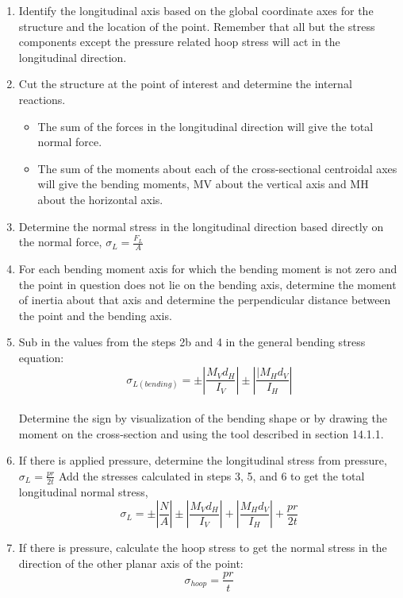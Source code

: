 \documentclass[
  letterpaper,
  DIV=11,
  numbers=noendperiod]{scrreprt}
\theoremstyle{definition}
\theoremstyle{remark}
\begin{document}
\begin{tcolorbox}[enhanced jigsaw, leftrule=.75mm, colbacktitle=quarto-callout-warning-color!10!white, breakable, opacityback=0, colback=white, titlerule=0mm, toprule=.15mm, colframe=quarto-callout-warning-color-frame, coltitle=black, title={Step-by-step: \textbf{Combined normal stress}}, toptitle=1mm, bottomrule=.15mm, rightrule=.15mm, left=2mm, arc=.35mm, opacitybacktitle=0.6, bottomtitle=1mm]

\begin{enumerate}
\def\labelenumi{\arabic{enumi}.}
\item
  Identify the longitudinal axis based on the global coordinate axes for
  the structure and the location of the point. Remember that all but the
  stress components except the pressure related hoop stress will act in
  the longitudinal direction.
\item
  Cut the structure at the point of interest and determine the internal
  reactions.

  \begin{itemize}
  \item
    The sum of the forces in the longitudinal direction will give the
    total normal force.
  \item
    The sum of the moments about each of the cross-sectional centroidal
    axes will give the bending moments, MV about the vertical axis and
    MH about the horizontal axis.
  \end{itemize}
\item
  Determine the normal stress in the longitudinal direction based
  directly on the normal force, \(\sigma_L=\frac{F_L}{A}\)
\item
  For each bending moment axis for which the bending moment is not zero
  and the point in question does not lie on the bending axis, determine
  the moment of inertia about that axis and determine the perpendicular
  distance between the point and the bending axis.
\item
  Sub in the values from the steps 2b and 4 in the general bending
  stress equation:\\
  \[
  \sigma_{L(bending)}= \pm\left|\frac{M_V d_H}{I_V}\right| \pm\left|\frac{\mid M_H d_V}{I_H}\right|
  \]\\
  Determine the sign by visualization of the bending shape or by drawing
  the moment on the cross-section and using the tool described in
  section 14.1.1.
\item
  If there is applied pressure, determine the longitudinal stress from
  pressure, \(\sigma_L=\frac{p r}{2 t}\) Add the stresses calculated in
  steps 3, 5, and 6 to get the total longitudinal normal stress,\\
  \[
  \sigma_L= \pm\left|\frac{N}{A}\right| \pm\left|\frac{M_V d_H}{I_V}\right|+\left|\frac{M_H d_V}{I_H}\right|+\frac{p r}{2 t}
  \]
\item
  If there is pressure, calculate the hoop stress to get the normal
  stress in the direction of the other planar axis of the point:\\
  \[
  \sigma_{hoop}=\frac{p r}{t}
  \]
\end{enumerate}

\end{tcolorbox}
\end{document}
